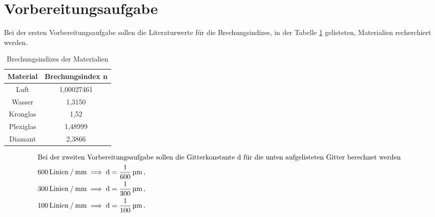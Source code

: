 \section{Vorbereitungsaufgabe}

\begin{flushleft}
    Bei der ersten Vorbereitungsaufgabe sollen die Literaturwerte für die Brechungsindizes, in der Tabelle \ref{Tabelle1} gelisteten, Materialien recherchiert werden. \cite{a2}
\end{flushleft}

\begin{table}[H]
    \centering
    \caption{Brechungsindizes der Materialien} 
    \label{Tabelle1}
    \begin{tabular} {c | c}
        \toprule
        {Material} &
        {Brechungsindex n} \\
        \midrule
        Luft      & 1,00027461 \\
        Wasser    & 1,3150     \\
        Kronglas  & 1,52       \\
        Plexiglas & 1,48999    \\
        Diamant   & 2,3866     \\
        \bottomrule
    \end{tabular} 
\end{table}

\begin{align*}
    \intertext{Bei der zweiten Vorbereitungsaufgabe sollen die Gitterkonstante d für die unten aufgelisteten Gitter berechnet werden}
    600\, \text{Linien} \mathbin{/} \unit{\milli\meter} \implies \text{d} = \frac{1}{600}\,\unit{\micro\meter}\,, \\
    300\, \text{Linien} \mathbin{/} \unit{\milli\meter} \implies \text{d} = \frac{1}{300}\,\unit{\micro\meter}\,, \\
    100\, \text{Linien} \mathbin{/} \unit{\milli\meter} \implies \text{d} = \frac{1}{100}\,\unit{\micro\meter}\,.
\end{align*}
